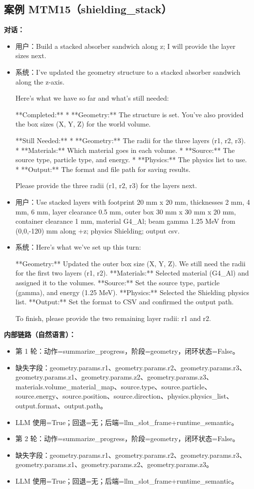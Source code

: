 \documentclass[11pt]{ctexart}
\begin{document}
\subsection{案例 MTM15（shielding\_stack）}
\textbf{对话：}
\begin{itemize}
\item 用户：Build a stacked absorber sandwich along z; I will provide the layer sizes next.
\item 系统：I've updated the geometry structure to a stacked absorber sandwich along the z-axis.

Here's what we have so far and what's still needed:

**Completed:**
*   **Geometry:** The structure is set. You've also provided the box sizes (X, Y, Z) for the world volume.

**Still Needed:**
*   **Geometry:** The radii for the three layers (r1, r2, r3).
*   **Materials:** Which material goes in each volume.
*   **Source:** The source type, particle type, and energy.
*   **Physics:** The physics list to use.
*   **Output:** The format and file path for saving results.

Please provide the three radii (r1, r2, r3) for the layers next.
\item 用户：Use stacked layers with footprint 20 mm x 20 mm, thicknesses 2 mm, 4 mm, 6 mm, layer clearance 0.5 mm, outer box 30 mm x 30 mm x 20 mm, container clearance 1 mm, material G4\_Al; beam gamma 1.25 MeV from (0,0,-120) mm along +z; physics Shielding; output csv.
\item 系统：Here's what we've set up this turn:

**Geometry:** Updated the outer box size (X, Y, Z). We still need the radii for the first two layers (r1, r2).
**Materials:** Selected material (G4\_Al) and assigned it to the volumes.
**Source:** Set the source type, particle (gamma), and energy (1.25 MeV).
**Physics:** Selected the Shielding physics list.
**Output:** Set the format to CSV and confirmed the output path.

To finish, please provide the two remaining layer radii: r1 and r2.
\end{itemize}
\textbf{内部链路（自然语言）：}
\begin{itemize}
\item 第 1 轮：动作=summarize\_progress，阶段=geometry，闭环状态=False。
\item 缺失字段：geometry.params.r1、geometry.params.r2、geometry.params.r3、geometry.params.z1、geometry.params.z2、geometry.params.z3、materials.volume\_material\_map、source.type、source.particle、source.energy、source.position、source.direction、physics.physics\_list、output.format、output.path。
\item LLM 使用=True；回退=无；后端=llm\_slot\_frame+runtime\_semantic。
\item 第 2 轮：动作=summarize\_progress，阶段=geometry，闭环状态=False。
\item 缺失字段：geometry.params.r1、geometry.params.r2、geometry.params.r3、geometry.params.z1、geometry.params.z2、geometry.params.z3。
\item LLM 使用=True；回退=无；后端=llm\_slot\_frame+runtime\_semantic。
\end{itemize}
\end{document}
